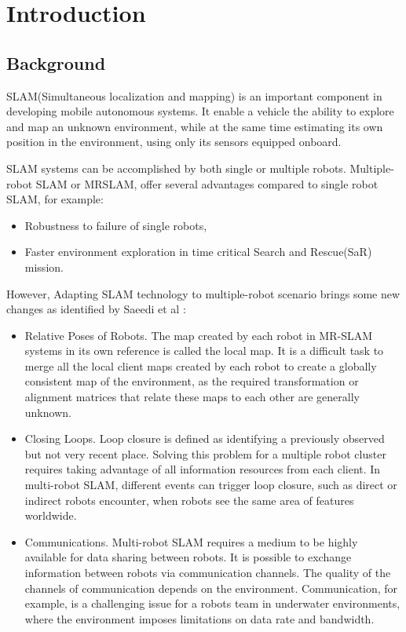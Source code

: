 
\chapter{Introduction}

\section{Background}

SLAM(Simultaneous localization and mapping) is an important component in developing mobile autonomous systems. It enable a vehicle the ability to explore and map an unknown environment, while at the same time estimating its own position in the environment, using only its sensors equipped onboard.

SLAM systems can be accomplished by both single or multiple robots. Multiple-robot SLAM or MRSLAM, offer several advantages compared to single robot SLAM, for example:
\begin{itemize}
	\item Robustness to failure of single robots,
	\item Faster environment exploration in time critical Search and Rescue(SaR) mission.
\end{itemize} 


However, Adapting SLAM technology to multiple-robot scenario brings some new changes as identified by Saeedi et al \cite{saeedi2016multiple}:
\begin{itemize}
	\item Relative Poses of Robots. The map created by each robot in MR-SLAM systems in its own reference is called the local map. It is a difficult task to merge all the local client maps created by each robot to create a globally consistent map of the environment, as the required transformation or alignment matrices that relate these maps to each other are generally unknown. 
	\item Closing Loops. Loop closure is defined as identifying a previously observed but not very recent place. Solving this problem for a multiple robot cluster requires taking advantage of all information resources from each client. In multi-robot SLAM, different events can trigger loop closure, such as direct or indirect robots encounter, when robots see the same area of features worldwide. 
	\item Communications. Multi-robot SLAM requires a medium to be highly available for data sharing between robots. It is possible to exchange information between robots via communication channels. The quality of the channels of communication depends on the environment. Communication, for example, is a challenging issue for a robots team in underwater environments, where the environment imposes limitations on data rate and bandwidth. 
\end{itemize}

